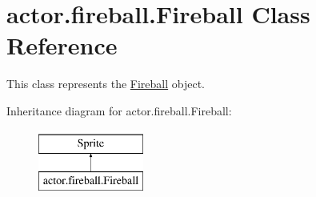 \hypertarget{classactor_1_1fireball_1_1_fireball}{}\section{actor.\+fireball.\+Fireball Class Reference}
\label{classactor_1_1fireball_1_1_fireball}


This class represents the \hyperlink{classactor_1_1fireball_1_1_fireball}{Fireball} object.  


Inheritance diagram for actor.\+fireball.\+Fireball\+:\begin{figure}[H]
\begin{center}
\leavevmode
\includegraphics[height=2.000000cm]{classactor_1_1fireball_1_1_fireball}
\end{center}
\end{figure}
